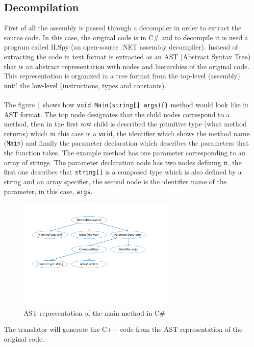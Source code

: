 \subsection{Decompilation}\label{SS:AN-Process-Decom}
First of all the assembly is passed through a decompiler in order to extract the source code. In this case, the original code is in C\# and to decompile it is used a program called ILSpy (an open-source .NET assembly decompiler). Instead of extracting the code in text format is extracted as an AST (Abstract Syntax Tree) that is an abstract representation with nodes and hierarchies of the original code. This representation is organized in a tree format from the top-level (assembly) until the low-level (instructions, types and constants).
\\
\\
The figure \ref{fig:AN-AST} shows how \verb!void Main(string[] args){}! method would look like in AST format. The top node designates that the child nodes correspond to a method, then in the first row child is described the primitive type (what method returns) which in this case is a \verb!void!, the identifier which shows the method name (\verb!Main!) and finally the parameter declaration which describes the parameters that the function takes. The example method has one parameter corresponding to an array of strings. The parameter declaration node has two nodes defining it, the first one describes that \verb!string[]! is a composed type which is also defined by a string and an array specifier, the second node is the identifier name of the parameter, in this case, \verb!args!.
\begin{figure}[H]\begin{center}
 \centering
  \captionsetup{justification=centering}
  \includegraphics[width=0.7\textwidth]{pictures/alternative/csharp_main_ast}
  \caption{AST representation of the main method in C\#\label{fig:AN-AST}}
\end{center}\end{figure}
The translator will generate the C++ code from the AST representation of the original code.
